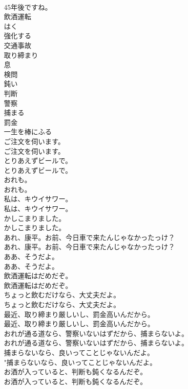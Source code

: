 \documentclass[8pt]{extreport}
\begin{document}
\begin{CJK}{UTF8}{min}
\\	45年後ですね。 
\\	飲酒運転
\\	はく
\\	強化する
\\	交通事故
\\	取り締まり
\\	息
\\	検問
\\	鈍い
\\	判断
\\	警察
\\	捕まる
\\	罰金
\\	一生を棒にふる
\\	ご注文を伺います。	
\\	ご注文を伺います。 
\\	とりあえずビールで。	
\\	とりあえずビールで。 
\\	おれも。	
\\	おれも。 
\\	私は、キウイサワー。	
\\	私は、キウイサワー。 
\\	かしこまりました。	
\\	かしこまりました。 
\\	あれ、康平。お前、今日車で来たんじゃなかったっけ？	
\\	あれ、康平。お前、今日車で来たんじゃなかったっけ？ 
\\	ああ、そうだよ。	
\\	ああ、そうだよ。 
\\	飲酒運転はだめだぞ。	
\\	飲酒運転はだめだぞ。 
\\	ちょっと飲むだけなら、大丈夫だよ。	
\\	ちょっと飲むだけなら、大丈夫だよ。 
\\	最近、取り締まり厳しいし、罰金高いんだから。	
\\	最近、取り締まり厳しいし、罰金高いんだから。 
\\	おれが通る道なら、警察いないはずだから、捕まらないよ。	
\\	おれが通る道なら、警察いないはずだから、捕まらないよ。 
\\	捕まらないなら、良いってことじゃないんだよ。	
\\	"捕まらないなら、良いってことじゃないんだよ。 
\\	お酒が入っていると、判断も鈍くなるんだぞ。	
\\	お酒が入っていると、判断も鈍くなるんだぞ。 

\end{CJK}
\end{document}
